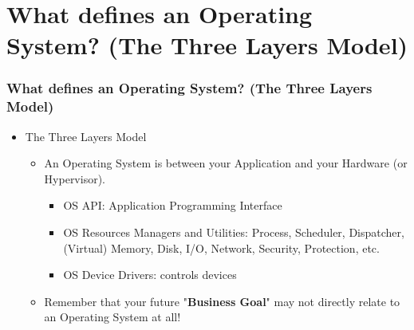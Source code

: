 \documentclass[aspectratio=169, xcolor=table, notheorems, hyperref={pdfpagelabels=false}]{beamer}
\begin{document}
\section{What defines an Operating System? (The Three Layers Model)}
\begin{frame}[fragile]
\frametitle{What defines an Operating System? (The Three Layers Model)}
\begin{multicols}{2}
\begin{table}
\end{table}
  \vfill \null
\columnbreak
  \begin{itemize}
    \item The Three Layers Model
  \begin{itemize}
    \item An Operating System is between your Application and your Hardware (or Hypervisor).
  \begin{itemize}
    \item OS API: Application Programming Interface
    \item OS Resources Managers and Utilities: Process, Scheduler, Dispatcher,
             (Virtual) Memory, Disk, I/O, Network, Security, Protection, etc.
    \item OS Device Drivers: controls devices
  \end{itemize}
    \item Remember that your future "\textbf{Business Goal}" may not directly relate to an Operating System at all!
  \end{itemize}
  \end{itemize}
  \vfill \null
\end{multicols}
\end{frame}
\end{document}
